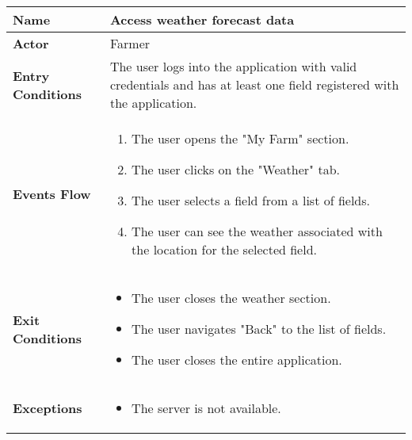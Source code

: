 \begin{center}
\renewcommand{\arraystretch}{1.25}
\begin{tabular}{|l|>{\raggedright\arraybackslash}m{12cm}|}
    \hline
    \textbf{Name} & Access weather forecast data\\
    \hline
   	\textbf{Actor} & Farmer\\
    \hline
    \textbf{Entry Conditions} & The user logs into the application with valid credentials and has at least one field registered with the application.\\
    \hline
    
    \textbf{Events Flow} & \begin{enumerate}
    			\item The user opens the "My Farm" section.
    			\item The user clicks on the "Weather" tab.
    			\item The user selects a field from a list of fields.
    			\item The user can see the weather associated with the location for the selected field.
	    		\end{enumerate}
    	\\
    \hline
    \textbf{Exit Conditions} & \begin{itemize}
    	\item The user closes the weather section.
    	\item The user navigates "Back" to the list of fields.
   		\item The user closes the entire application.
   		\end{itemize} \\
    \hline
    \textbf{Exceptions} &
    		\begin{itemize}
    			\item The server is not available.
    		\end{itemize}
    \\
    \hline
\end{tabular}
\end{center}